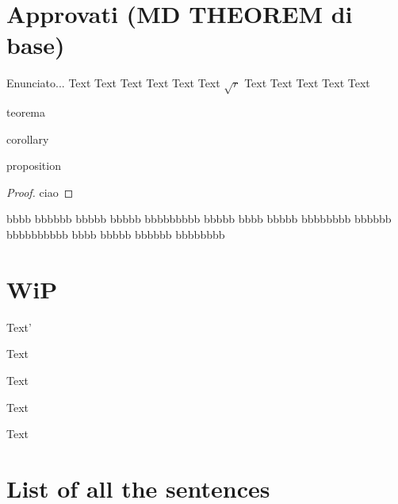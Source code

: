 \documentclass[a4paper,12pt]{report}
\begin{document}
\section{Approvati (MD THEOREM di base)}
\lipsum[1]

\begin{lemma}[di coso]
	Enunciato...
Text Text Text Text Text Text $\sqrt{r}$ Text Text Text Text Text



\end{lemma}%

\begin{theorem}%
teorema
\end{theorem}%

\begin{corollary}%
corollary
\end{corollary}%

\begin{proposition}%
proposition
\end{proposition}%

\begin{proof}
ciao
\end{proof}




\begin{definition}[Bu]
bbbb bbbbbb bbbbb bbbbb bbbbbbbbb bbbbb bbbb bbbbb bbbbbbbb bbbbbb bbbbbbbbbb bbbb bbbbb bbbbbb 
bbbbbbbb
\end{definition}


\section{WiP}

\begin{notationfix}
Text'
\end{notationfix}

\begin{TAM}
Text
\end{TAM}

\begin{example}
Text
\end{example}

\begin{observation}
Text
\end{observation}

\begin{remark}
Text
\end{remark}


\section{List of all the sentences}
\end{document}
